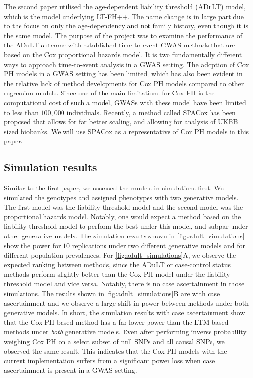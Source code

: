 The second paper utilised the age-dependent liability threshold (ADuLT) model, which is the model underlying LT-FH++. The name change 
is in large part due to the focus on only the age-dependency and not family history, even though it is the same model. The purpose of 
the project was to examine the performance of the ADuLT outcome with established time-to-event GWAS methods that are based on the Cox 
proportional hazards model. It is two fundamentally different ways to approach time-to-event analysis in a GWAS setting. The adoption 
of Cox PH models in a GWAS setting has been limited, which has also been evident in the relative lack of method developments for Cox 
PH models compared to other regression models. Since one of the main limitations for Cox PH is the computational cost of such a model, 
GWASs with these model have been limited to less than $ 100,000 $ individuals. Recently, a method called SPACox \cite{bi2020fast} has 
been proposed that allows for far better scaling, and allowing for analysis of UKBB sized biobanks. We will use SPACox as a 
representative of Cox PH models in this paper.


\subsection{Simulation results}

Similar to the first paper, we assessed the models in simulations first. We simulated the genotypes and assigned phenotypes with two 
generative models. The first model was the liability threshold model and the second model was the proportional hazards model. Notably, 
one would expect a method based on the liability threshold model to perform the best under this model, and subpar under other 
generative models. The simulation results shown in \cref{fig:adult_simulations} show the power for $ 10 $ replications under two 
different generative models and for different population prevalences. For \cref{fig:adult_simulations}A, we observe the expected 
ranking between methods, since the ADuLT or case-control status methods perform slightly better than the Cox PH model under the 
liability threshold model and vice versa. Notably, there is no case ascertainment in those simulations. The results shown in 
\cref{fig:adult_simulations}B are with case ascertainment and we observe a large shift in power between methods under both generative 
models. In short, the simulation results with case ascertainment show that the Cox PH based method has a far lower power than the LTM 
based methods under \textit{both} generative models. Even after performing inverse probability weighing Cox PH on a select subset of 
null SNPs and all causal SNPs, we observed the same result. This indicates that the Cox PH models with the current implementation 
suffers from a significant power loss when case ascertainment is present in a GWAS setting.

